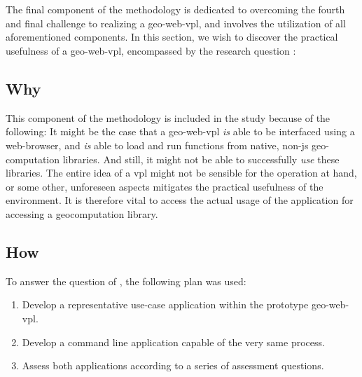 
\section{\mySubRQFourTitle} 
\label{sec:method-four}

The final component of the methodology is dedicated to overcoming the fourth and final challenge to realizing a \ac{geo-web-vpl}, and involves the utilization of all aforementioned components. 
In this section, we wish to discover the practical usefulness of a \ac{geo-web-vpl}, encompassed by the research question : \mySubRQFour


\subsection{Why}
This component of the methodology is included in the study because of the following: 
It might be the case that a geo-web-vpl \emph{is} able to be interfaced using a web-browser, and \emph{is} able to load and run functions from native, non-js geo-computation libraries. 
And still, it might not be able to successfully \emph{use} these libraries. 
The entire idea of a vpl might not be sensible for the operation at hand, or some other, unforeseen aspects mitigates the practical usefulness of the environment. 
It is therefore vital to access the actual usage of the application for accessing a geocomputation library.

\subsection{How}
To answer the question of \mySubRQFourTitle, the following plan was used: 
\begin{enumerate}[-]
  \item Develop a representative use-case application within the prototype \ac{geo-web-vpl}.
  \item Develop a command line application capable of the very same process.
  \item Assess both applications according to a series of assessment questions.
\end{enumerate}

